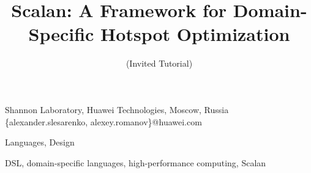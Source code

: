 \documentclass{sigplanconf}
\begin{document}
\setlength{\pdfpageheight}{\paperheight}
\setlength{\pdfpagewidth}{\paperwidth}






\title{Scalan: A Framework for Domain-Specific Hotspot Optimization}
\subtitle{(Invited Tutorial)}

           {Shannon Laboratory, Huawei Technologies, Moscow, Russia}
           {\{alexander.slesarenko, alexey.romanov\}@huawei.com}

\maketitle


\terms
Languages, Design

\keywords
DSL, domain-specific languages, high-performance computing, Scalan
\end{document}
